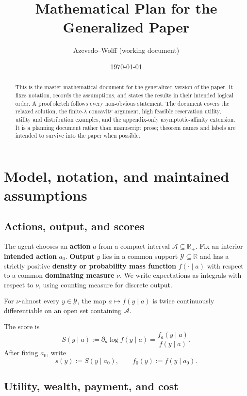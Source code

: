 \documentclass[11pt]{article}
\title{Mathematical Plan for the Generalized Paper}
\author{Azevedo--Wolff (working document)}
\date{\today}
\theoremstyle{remark}
\newcommand{\R}{\mathbb R}
\newcommand{\cA}{\mathcal A}
\newcommand{\cY}{\mathcal Y}
\begin{document}
\maketitle

\begin{abstract}
This is the master mathematical document for the generalized version of the paper.
It fixes notation, records the assumptions, and states the results in their intended
logical order.  A proof sketch follows every non-obvious statement.  The document
covers the relaxed solution, the finite-$\lambda$ concavity argument, high feasible
reservation utility, utility and distribution examples, and the appendix-only
asymptotic-affinity extension.  It is a planning document rather than manuscript
prose; theorem names and labels are intended to survive into the paper when possible.
\end{abstract}

\tableofcontents

\section{Model, notation, and maintained assumptions}

\subsection{Actions, output, and scores}

The agent chooses an \textbf{action} $a$ from a compact interval
$\cA\subseteq\R_+$.  Fix an interior \textbf{intended action} $a_0$.
\textbf{Output} $y$ lies in a common support $\cY\subseteq\R$ and has a strictly
positive \textbf{density or probability mass function} $f(\cdot\mid a)$ with
respect to a common \textbf{dominating measure} $\nu$.  We write expectations as
integrals with respect to $\nu$, using counting measure for discrete output.

For $\nu$-almost every $y\in\cY$, the map $a\mapsto f(y\mid a)$ is twice
continuously differentiable on an open set containing $\cA$.

The score is
\[
 S(y\mid a):=\partial_a\log f(y\mid a)=\frac{f_a(y\mid a)}{f(y\mid a)}.
\]
After fixing $a_0$, write
\[
 s(y):=S(y\mid a_0),\qquad f_0(y):=f(y\mid a_0).
\]

\subsection{Utility, wealth, payment, and cost}
\end{document}
